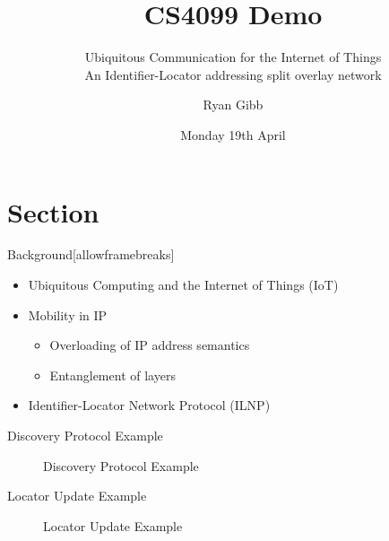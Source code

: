 \documentclass{beamer}
\title{CS4099 Demo}
\subtitle{Ubiquitous Communication for the Internet of Things\\An Identifier-Locator addressing split overlay network}
\author{Ryan Gibb}
\institute{School of Computer Science\\University of St Andrews}
\date{Monday 19th April}
\begin{document}
\begin{frame}
	\maketitle
\end{frame}

\section{Section}


\begin{frame}{Background}[allowframebreaks]
\begin{itemize}
    \item Ubiquitous Computing and the Internet of Things (IoT)
    \pause
    \item Mobility in IP
    \begin{itemize}
        \item Overloading of IP address semantics
        \item Entanglement of layers
    \end{itemize}
    \pause
    \item Identifier-Locator Network Protocol (ILNP)
    \pause
\end{itemize}
\end{frame}




\begin{frame}{Discovery Protocol Example}
\begin{figure}[ht]
    \centering
    \caption{Discovery Protocol Example}
    \label{fig:discovery}
\end{figure}
\end{frame}


\begin{frame}{Locator Update Example}
\begin{figure}[ht]
    \centering
    \caption{Locator Update Example}
    \label{fig:locator_udpate}
\end{figure}
\end{frame}
\end{document}
